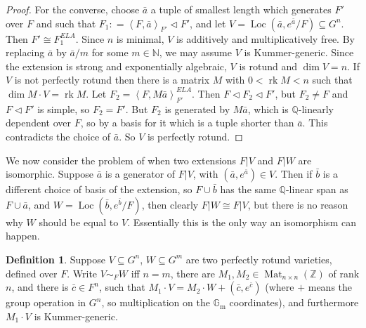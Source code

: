 \documentclass[12pt]{amsart}
\theoremstyle{definition}
\newtheorem{defn}[prop]{Definition}
\begin{document}
\begin{proof}
For the converse, choose ${{\ensuremath{\bar{a}}}}$ a tuple of smallest length which generates $F'$ over $F$ and such that $F_1 {\mathrel{\mathop:}=} {\ensuremath{\left\langle {F,{{\ensuremath{\bar{a}}}}} \right\rangle}}_{F'} {\ensuremath{\lhd}} F'$, and let $V = \operatorname{Loc}({{\ensuremath{\bar{a}}}},e^{{\ensuremath{\bar{a}}}}/F) {\subseteq} G^n$. Then $F' {\cong} F_1^{ELA}$. Since $n$ is minimal, $V$ is additively and multiplicatively free. By replacing ${{\ensuremath{\bar{a}}}}$ by ${{\ensuremath{\bar{a}}}} /m$ for some $m\in {\ensuremath{\mathbb{N}}}$, we may assume $V$ is {Kummer-generic}. Since the extension is strong and exponentially algebraic, $V$ is rotund and $\dim V = n$. If $V$ is not perfectly rotund then there is a matrix $M$ with $0 < \operatorname{rk} M < n$ such that
  $\dim M \cdot V = \operatorname{rk} M$. Let $F_2 = {\ensuremath{\left\langle {F,M\bar{a}} \right\rangle}}_{F'}^{ELA}$. Then
  $F {\ensuremath{\lhd}} F_2 {\ensuremath{\lhd}} F'$, but $F_2 \neq F$ and $F {\ensuremath{\lhd}} F'$ is simple, so $F_2 = F'$. But $F_2$ is generated by $M\bar{a}$, which is ${\ensuremath{\mathbb{Q}}}$-linearly dependent over $F$, so by a basis for it which is a tuple shorter than ${{\ensuremath{\bar{a}}}}$. This contradicts the choice of ${{\ensuremath{\bar{a}}}}$. So $V$ is perfectly rotund.
\end{proof}

We now consider the problem of when two extensions $F|V$ and $F|W$ are isomorphic. Suppose ${{\ensuremath{\bar{a}}}}$ is a generator of $F|V$, with $({{\ensuremath{\bar{a}}}},e^{{\ensuremath{\bar{a}}}}) \in V$. Then if ${{\ensuremath{\bar{b}}}}$ is a different choice of basis of the extension, so $F \cup {{\ensuremath{\bar{b}}}}$ has the same ${\ensuremath{\mathbb{Q}}}$-linear span as $F \cup {{\ensuremath{\bar{a}}}}$, and $W = \operatorname{Loc}({{\ensuremath{\bar{b}}}},e^{{\ensuremath{\bar{b}}}}/F)$, then clearly $F|W {\cong} F|V$, but there is no reason why $W$ should be equal to $V$. Essentially this is the only way an isomorphism can happen.

\begin{defn}
Suppose $V {\subseteq} G^n$, $W {\subseteq} G^m$ are two perfectly rotund varieties, defined over $F$. Write $V \sim_F W$ iff $n=m$, there are $M_1,M_2 \in \operatorname{Mat}_{n{\ensuremath{\times}} n}({\ensuremath{\mathbb{Z}}})$ of rank $n$, and there is ${{\ensuremath{\bar{c}}}} \in F^n$, such that $M_1 \cdot V = M_2 \cdot W + ({{\ensuremath{\bar{c}}}},e^{{\ensuremath{\bar{c}}}})$ (where $+$ means the group operation in $G^n$, so multiplication on the ${\ensuremath{\mathbb{G}_\mathrm{m}}}$ coordinates), and furthermore $M_1 \cdot V$ is Kummer-generic.
\end{defn}
\end{document}
